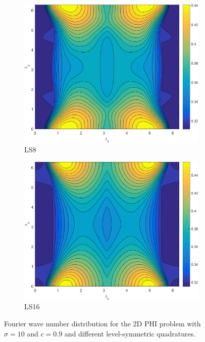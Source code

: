 \begin{figure}
{	}
	\vspace{1.5cm}
	{
	\begin{subfigure}[b]{0.485\textwidth}
		\centering
		\includegraphics[width=\textwidth]{figures/sec_DSA/MODPHI_SI_MIP_C=4_UPWLD1_ncells=2_LS8_sigt=10_c=9_contour.png}
		\caption{LS8}
	\end{subfigure}
	\hfill
	\begin{subfigure}[b]{0.485\textwidth}
		\centering
		\includegraphics[width=\textwidth]{figures/sec_DSA/MODPHI_SI_MIP_C=4_UPWLD1_ncells=2_LS16_sigt=10_c=9_contour.png}
		\caption{LS16}
	\end{subfigure}
	}
\caption{Fourier wave number distribution for the 2D PHI problem with $\sigma=10$ and $c=0.9$ and different level-symmetric quadratures.}
\label{fig::PHI_sig=10_c=0.9}
\end{figure}

